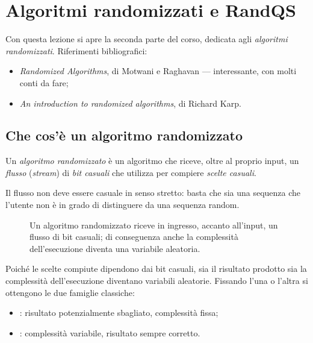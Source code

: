 \chapter{Algoritmi randomizzati e RandQS}
\label{cha:randqs}

Con questa lezione si apre la seconda parte del corso, dedicata agli
\emph{algoritmi randomizzati}. Riferimenti bibliografici:
\begin{itemize}
  \item \emph{Randomized Algorithms}, di Motwani e Raghavan --- interessante,
        con molti conti da fare;
  \item \emph{An introduction to randomized algorithms}, di Richard Karp.
\end{itemize}

\section{Che cos'è un algoritmo randomizzato}
\label{sec:def-randomizzato}

\begin{definizione}
\label{def:algoritmo-randomizzato}
Un \emph{algoritmo randomizzato} è un algoritmo che riceve, oltre al proprio
input, un \emph{flusso} (\emph{stream}) di \emph{bit casuali} che utilizza per
compiere \emph{scelte casuali}.
\end{definizione}

\begin{osservazione}
Il flusso non deve essere casuale in senso stretto: basta che sia una sequenza
che l'utente non è in grado di distinguere da una sequenza random.
\end{osservazione}

\begin{figure}[H]
  \centering
  
  \caption{Un algoritmo randomizzato riceve in ingresso, accanto all'input, un
  flusso di bit casuali; di conseguenza anche la complessità dell'esecuzione
  diventa una variabile aleatoria.}
  \label{fig:rand-schema-bit}
\end{figure}

Poiché le scelte compiute dipendono dai bit casuali, sia il risultato prodotto
sia la complessità dell'esecuzione diventano variabili aleatorie. Fissando
l'una o l'altra si ottengono le due famiglie classiche:
\begin{itemize}
  \item \MonteCarlo: risultato potenzialmente sbagliato, complessità fissa;
  \item \LasVegas: complessità variabile, risultato sempre corretto.
\end{itemize}

